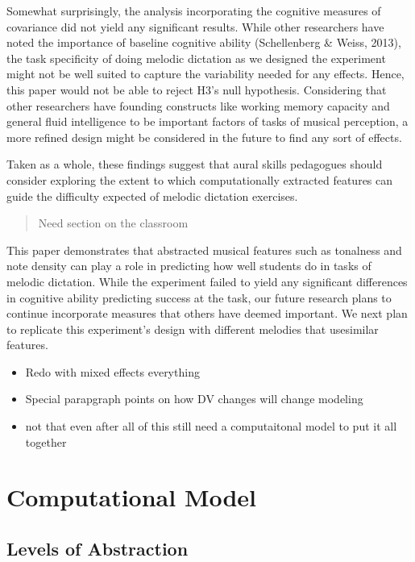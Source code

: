 \documentclass[]{book}
\providecommand{\tightlist}{%
  \setlength{\itemsep}{0pt}\setlength{\parskip}{0pt}}
\begin{document}
Somewhat surprisingly, the analysis incorporating the cognitive measures of covariance did not yield any significant
results.
While other researchers have noted the importance of baseline cognitive ability (Schellenberg \& Weiss, 2013), the task specificity of doing melodic dictation as we designed the experiment might not be well suited to capture the variability needed for any effects.
Hence, this paper would not be able to reject H3's null hypothesis.
Considering that other researchers have founding constructs like working memory capacity and general fluid intelligence to be important factors of tasks of musical perception, a more refined design might be considered in the future to find any sort of effects.

Taken as a whole, these findings suggest that aural skills pedagogues should consider exploring the extent to which computationally extracted features can guide the difficulty expected of melodic dictation exercises.

\begin{quote}
Need section on the classroom
\end{quote}

This paper demonstrates that abstracted musical features such as tonalness and note density can play a role in predicting how well students do in tasks of melodic dictation.
While the experiment failed to yield any significant differences in cognitive ability predicting success at the task, our future research plans to continue incorporate measures that others have deemed important.
We next plan to replicate this experiment's design with different melodies that usesimilar features.

\begin{itemize}
\tightlist
\item
  Redo with mixed effects everything
\item
  Special parapgraph points on how DV changes will change modeling
\item
  not that even after all of this still need a computaitonal model to put it all together
\end{itemize}

\hypertarget{computational-model}{%
\chapter{Computational Model}\label{computational-model}}

\hypertarget{levels-of-abstraction}{%
\section{Levels of Abstraction}\label{levels-of-abstraction}}
\end{document}
